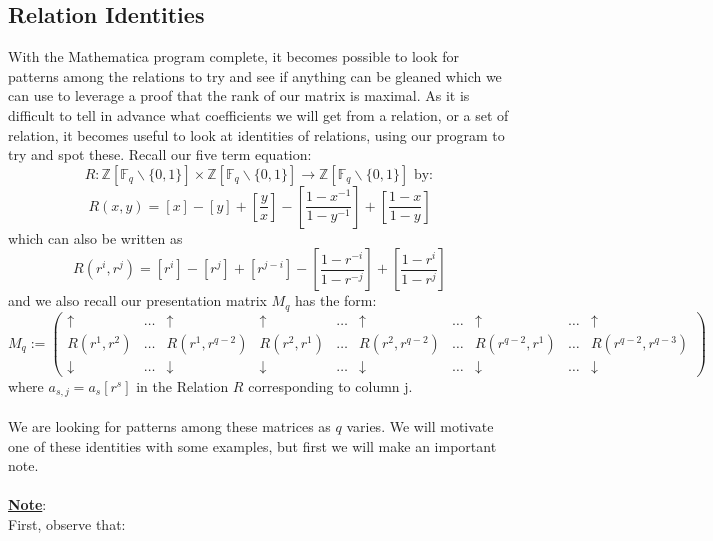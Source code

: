 \documentclass[11pt]{article}
\theoremstyle{plain}
\theoremstyle{definition}
\begin{document}
\subsection{Relation Identities}\label{section:mathmode}

With the Mathematica program complete, it becomes possible to look for patterns among the relations to try and see if anything can be gleaned which we can use to leverage a proof that the rank of our matrix is maximal. As it is difficult to tell in advance what coefficients we will get from a relation, or a set of relation, it becomes useful to look at identities of relations, using our program to try and spot these. Recall our five term equation:
\begin{equation*}
R:  \mathbb{Z} [\mathbb{F}_{q}  \backslash \{0,1\}] \times \mathbb{Z} [\mathbb{F}_{q}  \backslash \{0,1\}]  \rightarrow \mathbb{Z} [\mathbb{F}_{q}  \backslash \{0,1\}]\text{ by}:
\end{equation*}
\begin{equation*}
R(x,y) = [x] - [y] + [\frac{y}{x}] - [\frac{1-x^{-1}}{1-y^{-1}}] + [\frac{1-x}{1-y}] 
\end{equation*}
which can also be written as
\begin{equation*}
R(r^{i},r^{j}) = [r^{i}] - [r^{j}] + [r^{j-i}] - [\frac{1-r^{-i}}{1-r^{-j}}] + [\frac{1-r^{i}}{1-r^{j}}]
\end{equation*}
and we also recall our presentation matrix $M_q$ has the form:
\[ M_q := \left( \begin{array}{ccccccccccc}
\uparrow  & \dots  & \uparrow &  \uparrow &   \dots &  \uparrow & \dots  & \uparrow  & \dots & \uparrow \\
R(r^1, r^2) &   \dots &  R(r^1, r^{q-2}) & R(r^2, r^1)  & \dots & R(r^2, r^{q-2}) & \dots &  R(r^{q-2}, r^1) & \dots & R(r^{q-2}, r^{q-3})  \\
\downarrow  & \dots  & \downarrow &  \downarrow  & \dots &  \downarrow & \dots  & \downarrow & \dots & \downarrow \end{array} \right)\] 
where $a_{s,j} = a_s [r^s]$  in the Relation $R$ corresponding to column j.\\
\\
We are looking for patterns among these matrices as $q$ varies. We will motivate one of these identities with some examples, but first we will make an important note.\\
\\
\textbf{\underline{Note}}:\\ First, observe that:
\end{document}
